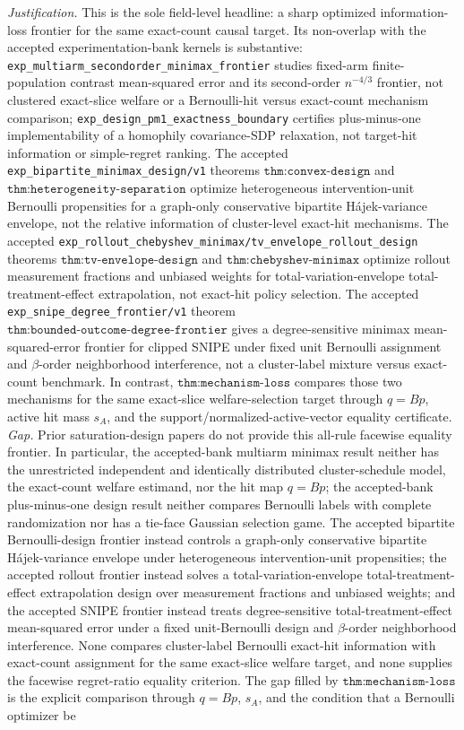 \documentclass{article}
\begin{document}
\par\smallskip\noindent \textit{Justification.} This is the sole field-level headline: a sharp optimized information-loss frontier for the same exact-count causal target. Its non-overlap with the accepted experimentation-bank kernels is substantive: \texttt{exp\_multiarm\_secondorder\_minimax\_frontier} studies fixed-arm finite-population contrast mean-squared error and its second-order \(n^{-4/3}\) frontier, not clustered exact-slice welfare or a Bernoulli-hit versus exact-count mechanism comparison; \texttt{exp\_design\_pm1\_exactness\_boundary} certifies plus-minus-one implementability of a homophily covariance-SDP relaxation, not target-hit information or simple-regret ranking. The accepted \texttt{exp\_bipartite\_minimax\_design/v1} theorems \(\texttt{thm:convex-design}\) and \(\texttt{thm:heterogeneity-separation}\) optimize heterogeneous intervention-unit Bernoulli propensities for a graph-only conservative bipartite H\'ajek-variance envelope, not the relative information of cluster-level exact-hit mechanisms. The accepted \texttt{exp\_rollout\_chebyshev\_minimax/tv\_envelope\_rollout\_design} theorems \(\texttt{thm:tv-envelope-design}\) and \(\texttt{thm:chebyshev-minimax}\) optimize rollout measurement fractions and unbiased weights for total-variation-envelope total-treatment-effect extrapolation, not exact-hit policy selection. The accepted \texttt{exp\_snipe\_degree\_frontier/v1} theorem \(\texttt{thm:bounded-outcome-degree-frontier}\) gives a degree-sensitive minimax mean-squared-error frontier for clipped SNIPE under fixed unit Bernoulli assignment and \(\beta\)-order neighborhood interference, not a cluster-label mixture versus exact-count benchmark. In contrast, \(\texttt{thm:mechanism-loss}\) compares those two mechanisms for the same exact-slice welfare-selection target through \(q=Bp\), active hit mass \(s_A\), and the support/normalized-active-vector equality certificate. \textit{Gap.} Prior saturation-design papers do not provide this all-rule facewise equality frontier. In particular, the accepted-bank multiarm minimax result neither has the unrestricted independent and identically distributed cluster-schedule model, the exact-count welfare estimand, nor the hit map \(q=Bp\); the accepted-bank plus-minus-one design result neither compares Bernoulli labels with complete randomization nor has a tie-face Gaussian selection game. The accepted bipartite Bernoulli-design frontier instead controls a graph-only conservative bipartite H\'ajek-variance envelope under heterogeneous intervention-unit propensities; the accepted rollout frontier instead solves a total-variation-envelope total-treatment-effect extrapolation design over measurement fractions and unbiased weights; and the accepted SNIPE frontier instead treats degree-sensitive total-treatment-effect mean-squared error under a fixed unit-Bernoulli design and \(\beta\)-order neighborhood interference. None compares cluster-label Bernoulli exact-hit information with exact-count assignment for the same exact-slice welfare target, and none supplies the facewise regret-ratio equality criterion. The gap filled by \(\texttt{thm:mechanism-loss}\) is the explicit comparison through \(q=Bp\), \(s_A\), and the condition that a Bernoulli optimizer be 
\end{document}
